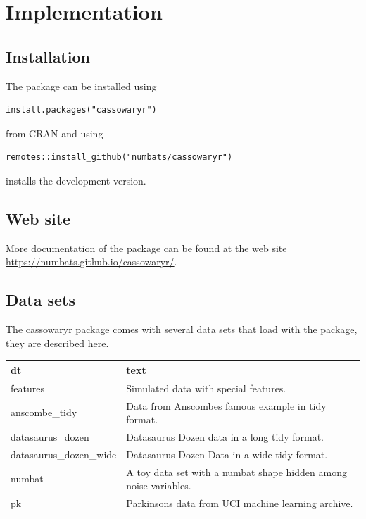 \hypertarget{implementation}{%
\section{Implementation}\label{implementation}}

\hypertarget{installation}{%
\subsection{Installation}\label{installation}}

The package can be installed using

\begin{verbatim}
install.packages("cassowaryr")
\end{verbatim}

from CRAN and using

\begin{verbatim}
remotes::install_github("numbats/cassowaryr")
\end{verbatim}

installs the development version.

\hypertarget{web-site}{%
\subsection{Web site}\label{web-site}}

More documentation of the package can be found at the web site
\url{https://numbats.github.io/cassowaryr/}.

\hypertarget{data-sets}{%
\subsection{Data sets}\label{data-sets}}

The cassowaryr package comes with several data sets that load with the
package, they are described here.

\begin{Schunk}

\begin{tabular}{l|l}
\hline
dt & text\\
\hline
features & Simulated data with special features.\\
\hline
anscombe\_tidy & Data from Anscombes famous example in tidy format.\\
\hline
datasaurus\_dozen & Datasaurus Dozen data in a long tidy format.\\
\hline
datasaurus\_dozen\_wide & Datasaurus Dozen Data in a wide tidy format.\\
\hline
numbat & A toy data set with a numbat shape hidden among noise variables.\\
\hline
pk & Parkinsons data from UCI machine learning archive.\\
\hline
\end{tabular}

\end{Schunk}

